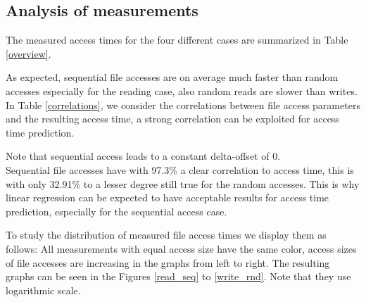 \documentclass{superfri}
\begin{document}
	\subsection{Analysis of measurements}
	\label{sec:measurements}
	The measured access times for the four different cases are summarized in Table\,\ref{overview}.
	
	As expected, sequential file accesses are on average much faster than random accesses especially for the reading case, also random reads are slower than writes. In Table \ref{correlations}, we consider the correlations between file access parameters and the resulting access time, a strong correlation can be exploited for access time prediction.
	
	Note that sequential access leads to a constant delta-offset of $0$.\\
	Sequential file accesses have with 97.3\% a clear correlation to access time, this is with only 32.91\% to a lesser degree still true for the random accesses.
	This is why linear regression can be expected to have acceptable results for access time prediction, especially for the sequential access case.
	
	\medskip
	
	To study the distribution of measured file access times we display them as follows:
	All measurements with equal access size have the same color, access sizes of file accesses are increasing in the graphs from left to right.
	The resulting graphs can be seen in the Figures \ref{read_seq} to \ref{write_rnd}. Note that they use logarithmic scale.
	
\end{document}

